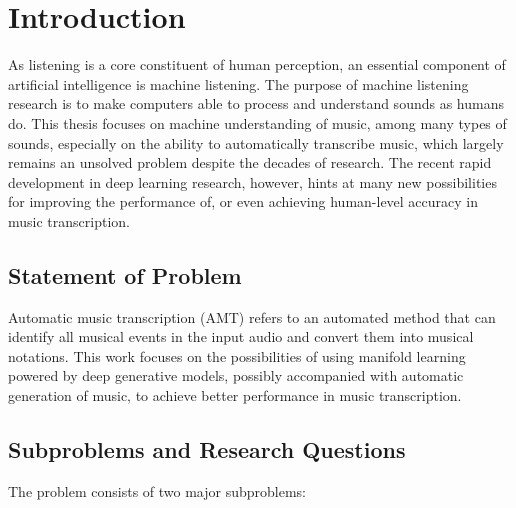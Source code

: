 
\graphicspath{{1/figures/}}

\chapter{Introduction}
\label{ch:introduction}

As listening is a core constituent of human perception, an essential component of artificial intelligence is machine listening.
The purpose of machine listening research is to make computers able to process and understand sounds as humans do.
This thesis focuses on machine understanding of music, among many types of sounds, especially on the ability to automatically transcribe music, which largely remains an unsolved problem despite the decades of research.
The recent rapid development in deep learning research, however, hints at many new possibilities for improving the performance of, or even achieving human-level accuracy in music transcription.


\section{Statement of Problem}

Automatic music transcription (AMT) refers to an automated method that can identify all musical events in the input audio and convert them into musical notations.
This work focuses on the possibilities of using manifold learning powered by deep generative models, possibly accompanied with automatic generation of music, to achieve better performance in music transcription.


\section{Subproblems and Research Questions}

The problem consists of two major subproblems:

\vspace{1em}

